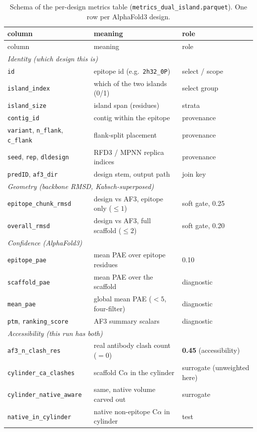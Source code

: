 \begin{center}
\begin{longtable}{lll}
\caption{Schema of the per-design metrics table (\texttt{metrics\_dual\_island.parquet}).
One row per AlphaFold3 design.}\label{tab:metricschema}\\
\toprule
column & meaning & role \\
\midrule
\endfirsthead
\toprule column & meaning & role \\ \midrule \endhead
\multicolumn{3}{l}{\emph{Identity (which design this is)}}\\
\texttt{id}            & epitope id (e.g.\ \texttt{2h32\_0P}) & select / scope \\
\texttt{island\_index} & which of the two islands (0/1)        & select group \\
\texttt{island\_size}  & island span (residues)                & strata \\
\texttt{contig\_id}    & contig within the epitope             & provenance \\
\texttt{variant}, \texttt{n\_flank}, \texttt{c\_flank} & flank-split placement & provenance \\
\texttt{seed}, \texttt{rep}, \texttt{dldesign} & RFD3 / MPNN replica indices & provenance \\
\texttt{predID}, \texttt{af3\_dir} & design stem, output path     & join key \\
\midrule
\multicolumn{3}{l}{\emph{Geometry (backbone RMSD, Kabsch-superposed)}}\\
\texttt{epitope\_chunk\_rmsd} & design vs AF3, epitope only ($\le 1$) & soft gate, 0.25 \\
\texttt{overall\_rmsd}        & design vs AF3, full scaffold ($\le 2$) & soft gate, 0.20 \\
\midrule
\multicolumn{3}{l}{\emph{Confidence (AlphaFold3)}}\\
\texttt{epitope\_pae}  & mean PAE over epitope residues   & 0.10 \\
\texttt{scaffold\_pae} & mean PAE over the scaffold        & diagnostic \\
\texttt{mean\_pae}     & global mean PAE ($<5$, four-filter) & diagnostic \\
\texttt{ptm}, \texttt{ranking\_score} & AF3 summary scalars & diagnostic \\
\midrule
\multicolumn{3}{l}{\emph{Accessibility (this run has both)}}\\
\texttt{af3\_n\_clash\_res} & real antibody clash count ($=0$) & \textbf{0.45} (accessibility) \\
\texttt{cylinder\_ca\_clashes}   & scaffold C$\alpha$ in the cylinder & surrogate (unweighted here) \\
\texttt{cylinder\_native\_aware} & same, native volume carved out     & surrogate \\
\texttt{native\_in\_cylinder}    & native non-epitope C$\alpha$ in cylinder & test \\
\bottomrule
\end{longtable}
\end{center}

